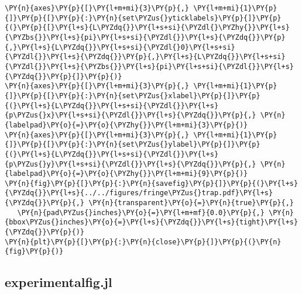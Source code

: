 \begin{Verbatim}[commandchars=\\\{\}]
\PY{n}{axes}\PY{p}{[}\PY{l+m+mi}{3}\PY{p}{,} \PY{l+m+mi}{1}\PY{p}{]}\PY{p}{[}\PY{p}{:}\PY{n}{set\PYZus{}yticklabels}\PY{p}{]}\PY{p}{(}\PY{p}{[}\PY{l+s}{L\PYZdq{}}\PY{l+s+si}{\PYZdl{}\PYZhy{}}\PY{l+s}{\PYZbs{}}\PY{l+s}{pi}\PY{l+s+si}{\PYZdl{}}\PY{l+s}{\PYZdq{}}\PY{p}{,}\PY{l+s}{L\PYZdq{}}\PY{l+s+si}{\PYZdl{}0}\PY{l+s+si}{\PYZdl{}}\PY{l+s}{\PYZdq{}}\PY{p}{,}\PY{l+s}{L\PYZdq{}}\PY{l+s+si}{\PYZdl{}}\PY{l+s}{\PYZbs{}}\PY{l+s}{pi}\PY{l+s+si}{\PYZdl{}}\PY{l+s}{\PYZdq{}}\PY{p}{]}\PY{p}{)}
\PY{n}{axes}\PY{p}{[}\PY{l+m+mi}{3}\PY{p}{,} \PY{l+m+mi}{1}\PY{p}{]}\PY{p}{[}\PY{p}{:}\PY{n}{set\PYZus{}xlabel}\PY{p}{]}\PY{p}{(}\PY{l+s}{L\PYZdq{}}\PY{l+s+si}{\PYZdl{}}\PY{l+s}{p\PYZus{}x}\PY{l+s+si}{\PYZdl{}}\PY{l+s}{\PYZdq{}}\PY{p}{,} \PY{n}{labelpad}\PY{o}{=}\PY{o}{\PYZhy{}}\PY{l+m+mi}{3}\PY{p}{)}
\PY{n}{axes}\PY{p}{[}\PY{l+m+mi}{3}\PY{p}{,} \PY{l+m+mi}{1}\PY{p}{]}\PY{p}{[}\PY{p}{:}\PY{n}{set\PYZus{}ylabel}\PY{p}{]}\PY{p}{(}\PY{l+s}{L\PYZdq{}}\PY{l+s+si}{\PYZdl{}}\PY{l+s}{p\PYZus{}y}\PY{l+s+si}{\PYZdl{}}\PY{l+s}{\PYZdq{}}\PY{p}{,} \PY{n}{labelpad}\PY{o}{=}\PY{o}{\PYZhy{}}\PY{l+m+mi}{9}\PY{p}{)}
\PY{n}{fig}\PY{p}{[}\PY{p}{:}\PY{n}{savefig}\PY{p}{]}\PY{p}{(}\PY{l+s}{\PYZdq{}}\PY{l+s}{../../figures/fringe\PYZus{}trap.pdf}\PY{l+s}{\PYZdq{}}\PY{p}{,} \PY{n}{transparent}\PY{o}{=}\PY{n}{true}\PY{p}{,}
   \PY{n}{pad\PYZus{}inches}\PY{o}{=}\PY{l+m+mf}{0.0}\PY{p}{,} \PY{n}{bbox\PYZus{}inches}\PY{o}{=}\PY{l+s}{\PYZdq{}}\PY{l+s}{tight}\PY{l+s}{\PYZdq{}}\PY{p}{)}
\PY{n}{plt}\PY{p}{[}\PY{p}{:}\PY{n}{close}\PY{p}{]}\PY{p}{(}\PY{n}{fig}\PY{p}{)}
\end{Verbatim}


\subsection{experimental\textunderscore fig.jl}\label{subsec:experimental}

